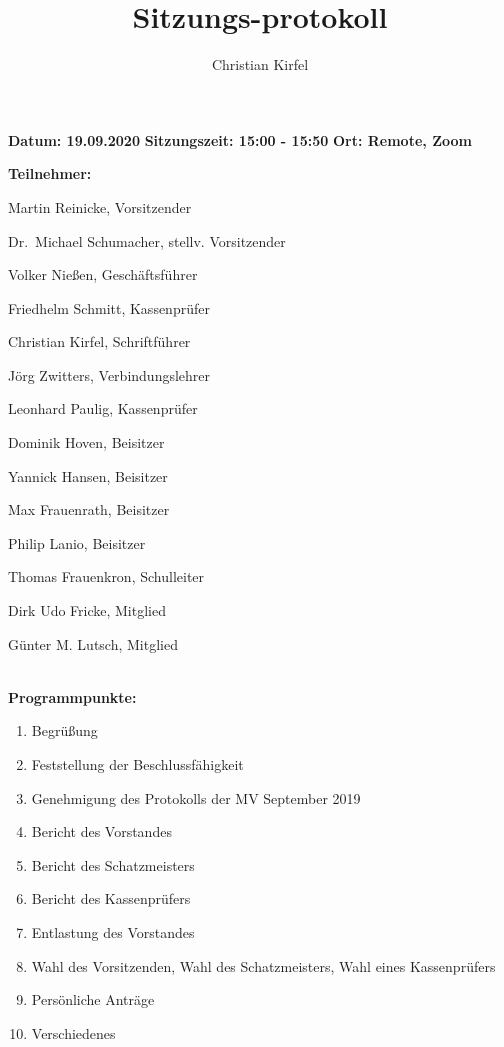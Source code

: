 \documentclass[a4paper, 11pt]{article}
\title{Sitzungs-protokoll}
\author{Christian Kirfel}
\begin{document}
\pagestyle{style1}

\textbf{Datum: 19.09.2020} %
\textbf{Sitzungszeit: 15:00 - 15:50}
\textbf{Ort: Remote, Zoom} %

\textbf{Teilnehmer:} %
\begin{description}
\item Martin Reinicke, Vorsitzender
\item Dr.~Michael Schumacher, stellv. Vorsitzender
\item Volker Nießen, Geschäftsführer
\item Friedhelm Schmitt, Kassenprüfer
\item Christian Kirfel, Schriftführer
\item Jörg Zwitters, Verbindungslehrer
\item Leonhard Paulig, Kassenprüfer
\item Dominik Hoven, Beisitzer
\item Yannick Hansen, Beisitzer
\item Max Frauenrath, Beisitzer
\item Philip Lanio, Beisitzer
\item Thomas Frauenkron, Schulleiter
\item Dirk Udo Fricke, Mitglied
\item Günter M. Lutsch, Mitglied
\end{description}

\makebox[\linewidth]{\rule{\linewidth}{0.4pt}}\\
\textbf{Programmpunkte:} 
\begin{enumerate}
\item Begrüßung
\item Feststellung der Beschlussfähigkeit
\item Genehmigung des Protokolls der MV September 2019
\item Bericht des Vorstandes
\item Bericht des Schatzmeisters
\item Bericht des Kassenprüfers
\item Entlastung des Vorstandes
\item Wahl des Vorsitzenden, Wahl des Schatzmeisters, Wahl eines Kassenprüfers
\item Persönliche Anträge
\item Verschiedenes
\end{enumerate}
\makebox[\linewidth]{\rule{\linewidth}{0.4pt}}\\
\end{document}
